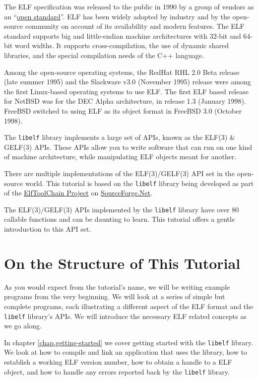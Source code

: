 \documentclass[a4paper,pdftex]{book}
\newcommand{\elftoolchainproject}{\href{https://elftoolchain.sourceforge.io/}%
    {ElfToolChain Project}\xspace}%
\newcommand{\library}[1]{\texttt{#1}}
\newcommand{\reg}{\textregistered\xspace}
\newcommand{\trade}{\texttrademark\xspace}
\begin{document}
The ELF specification was released to the public in
1990 by a group of vendors as an
``\href{https://refspecs.linuxbase.org/elf/elf.pdf}{open
  standard}''. ELF has been widely adopted by industry and by the
open-source community on account of its availability and modern
features.  The ELF standard supports big and little-endian machine
architectures with 32-bit and 64-bit word widths. It supports
cross-compilation, the use of dynamic shared libraries, and the
special compilation needs of the C++ language.

Among the open-source operating systems, the
RedHat\trade RHL 2.0 Beta release (late summer 1995) and the Slackware
v3.0 (November 1995) release were among the first Linux\reg-based
operating systems to use ELF.  The first ELF based release for
NetBSD\trade was for the DEC Alpha\trade architecture, in release 1.3
(January 1998).  FreeBSD\trade switched to using ELF as its object
format in FreeBSD 3.0 (October 1998).

The \library{libelf} library implements a large set of APIs, known as
the ELF(3) \& GELF(3) APIs.
These APIs allow you to write software that can run on one kind of
machine architecture, while manipulating ELF objects meant for
another.

There are multiple implementations of the ELF(3)/GELF(3) API set in
the open-source world.  This tutorial is based on the \library{libelf}
library being developed as part of the \elftoolchainproject on
\href{https://sourceforge.net/}{SourceForge.Net}.

The ELF(3)/GELF(3) APIs implemented by the \library{libelf} library
have over 80 callable functions and can be daunting to learn.  This
tutorial offers a gentle introduction to this API set.

\section{On the Structure of This Tutorial}

As you would expect from the tutorial's name, we will be writing
example programs from the very beginning. We will look at a series of
simple but complete programs, each illustrating a different aspect of
the ELF format and the \library{libelf} library's APIs. We will
introduce the necessary ELF related concepts as we go along.

In chapter \vref{chap.getting-started} we cover getting started
with the \library{libelf} library. We look at how to compile and link
an application that uses the library, how to establish a working ELF
version number, how to obtain a handle to a ELF object, and how to
handle any errors reported back by the \library{libelf} library.
\end{document}
